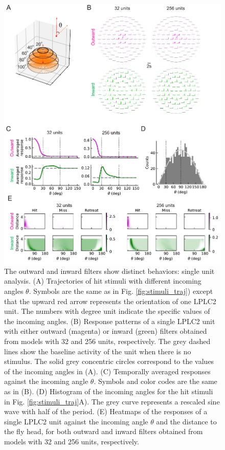 \documentclass[9pt,lineno]{elife}
\begin{document}
\begin{figure}
\includegraphics[width=\linewidth]{figures/compare_outward_inward_single_unit_paper.pdf}
\caption{The outward and inward filters show distinct behaviors: single unit analysis. (A) Trajectories of hit stimuli with different incoming angles $\theta$. Symbols are the same as in Fig. \ref{fig:stimuli_traj}) except that the upward red arrow represents the orientation of one LPLC2 unit. The numbers with degree unit indicate the specific values of the incoming angles. (B) Response patterns of a single LPLC2 unit with either outward (magenta) or inward (green) filters obtained from models with 32 and 256 units, respectively. The grey dashed lines show the baseline activity of the unit when there is no stimulus. The solid grey concentric circles correspond to the values of the incoming angles in (A). (C) Temporally averaged responses against the incoming angle $\theta$. Symbols and color codes are the same as in (B). (D) Histogram of the incoming angles for the hit stimuli in Fig. \ref{fig:stimuli_traj}A). The grey curve represents a rescaled sine wave with half of the period. (E) Heatmaps of the responses of a single LPLC2 unit against the incoming angle $\theta$ and the distance to the fly head, for both outward and inward filters obtained from models with 32 and 256 units, respectively.}

\end{figure}
\end{document}
